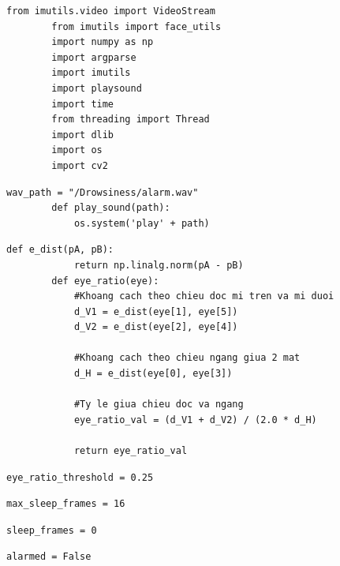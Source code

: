     \begin{lstlisting}[caption={Import library}]
        from imutils.video import VideoStream
        from imutils import face_utils
        import numpy as np
        import argparse
        import imutils
        import playsound
        import time
        from threading import Thread
        import dlib
        import os
        import cv2
    \end{lstlisting}

    \begin{lstlisting}[caption={Setup sound file and turn it on}]
        wav_path = "/Drowsiness/alarm.wav"
        def play_sound(path):
            os.system('play' + path)
    \end{lstlisting}

    \begin{lstlisting}[caption={Compute the distance between 2 point A and B}]
        def e_dist(pA, pB):
            return np.linalg.norm(pA - pB)
        def eye_ratio(eye):
            #Khoang cach theo chieu doc mi tren va mi duoi
            d_V1 = e_dist(eye[1], eye[5])
            d_V2 = e_dist(eye[2], eye[4])
        
            #Khoang cach theo chieu ngang giua 2 mat
            d_H = e_dist(eye[0], eye[3])
        
            #Ty le giua chieu doc va ngang
            eye_ratio_val = (d_V1 + d_V2) / (2.0 * d_H)
            
            return eye_ratio_val
    \end{lstlisting}

    \begin{lstlisting}[caption={Define threshold level. If smaller than this is drowsiness}]
        eye_ratio_threshold = 0.25
    \end{lstlisting}

    \begin{lstlisting}[caption={Threshold so frame lien tuc nham mat}]
        max_sleep_frames = 16
    \end{lstlisting}

    \begin{lstlisting}[caption={Dem so frame ngu}]
        sleep_frames = 0
    \end{lstlisting}

    \begin{lstlisting}[caption={Check xem da canh bao hay chua}]
        alarmed = False 
    \end{lstlisting}

